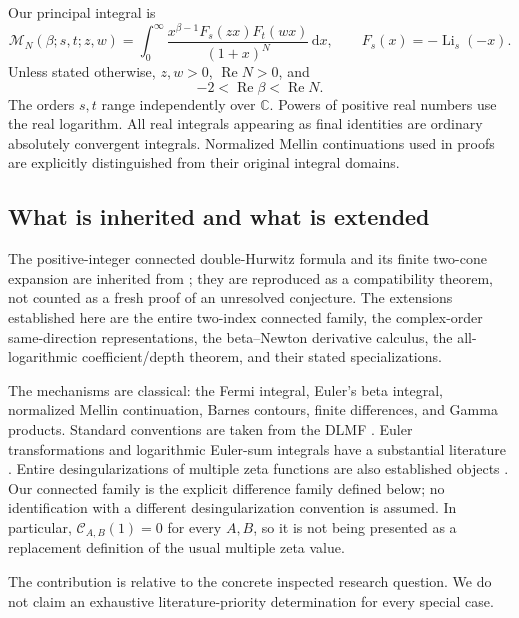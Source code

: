\documentclass[11pt]{article}
\numberwithin{equation}{section}
\theoremstyle{definition}
\DeclareMathOperator{\Li}{Li}
\DeclareMathOperator{\Rea}{Re}
\newcommand{\C}{\mathbb C}
\newcommand{\dd}{\,\mathrm d}
\newcommand{\CC}{\mathcal C}
\newcommand{\MM}{\mathcal M}
\begin{document}
Our principal integral is
\begin{equation}\label{eq:main-integral}
 \MM_N(\beta;s,t;z,w)
 =\int_0^\infty\frac{x^{\beta-1}F_s(zx)F_t(wx)}{(1+x)^N}\dd x,
 \qquad F_s(x)=-\Li_s(-x).
\end{equation}
Unless stated otherwise, $z,w>0$, $\Rea N>0$, and
\begin{equation}\label{eq:universal-strip}
 -2<\Rea\beta<\Rea N.
\end{equation}
The orders $s,t$ range independently over $\C$. Powers of positive real numbers use the real logarithm. All real integrals appearing as final identities are ordinary absolutely convergent integrals. Normalized Mellin continuations used in proofs are explicitly distinguished from their original integral domains.

\subsection{What is inherited and what is extended}
The positive-integer connected double-Hurwitz formula and its finite two-cone expansion are inherited from \cite{BMH}; they are reproduced as a compatibility theorem, not counted as a fresh proof of an unresolved conjecture. The extensions established here are the entire two-index connected family, the complex-order same-direction representations, the beta--Newton derivative calculus, the all-logarithmic coefficient/depth theorem, and their stated specializations.

The mechanisms are classical: the Fermi integral, Euler's beta integral, normalized Mellin continuation, Barnes contours, finite differences, and Gamma products. Standard conventions are taken from the DLMF \cite{DLMFbeta,DLMFzeta,DLMFpoly,DLMFlerch}. Euler transformations and logarithmic Euler-sum integrals have a substantial literature \cite{Sondow,Coffey,Tiered}. Entire desingularizations of multiple zeta functions are also established objects \cite{FKMT}. Our connected family is the explicit difference family defined below; no identification with a different desingularization convention is assumed. In particular, $\CC_{A,B}(1)=0$ for every $A,B$, so it is not being presented as a replacement definition of the usual multiple zeta value.

The contribution is relative to the concrete inspected research question. We do not claim an exhaustive literature-priority determination for every special case.
\end{document}
